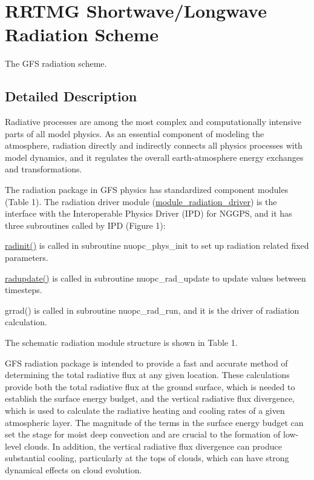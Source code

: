 \hypertarget{group___r_r_t_m_g}{}\section{R\+R\+T\+MG Shortwave/\+Longwave Radiation Scheme}
\label{group___r_r_t_m_g}


The G\+FS radiation scheme.  




\subsection{Detailed Description}
Radiative processes are among the most complex and computationally intensive parts of all model physics. As an essential component of modeling the atmosphere, radiation directly and indirectly connects all physics processes with model dynamics, and it regulates the overall earth-\/atmosphere energy exchanges and transformations.

The radiation package in G\+FS physics has standardized component modules (Table 1). The radiation driver module (\hyperlink{group__module__radiation__driver}{module\+\_\+radiation\+\_\+driver}) is the interface with the Interoperable Physics Driver (I\+PD) for N\+G\+G\+PS, and it has three subroutines called by I\+PD (Figure 1)\+:
\begin{DoxyItemize}
\item \hyperlink{group__module__radiation__driver_ga3d4ef1d77b7d7ef09fafcb4413e1cbf2}{radinit()} is called in subroutine nuopc\+\_\+phys\+\_\+init to set up radiation related fixed parameters.
\item \hyperlink{group__module__radiation__driver_ga28280ee9ea8ee0d183ab9d541a31b718}{radupdate()} is called in subroutine nuopc\+\_\+rad\+\_\+update to update values between timesteps.
\item grrad() is called in subroutine nuopc\+\_\+rad\+\_\+run, and it is the driver of radiation calculation. 
\end{DoxyItemize}

The schematic radiation module structure is shown in Table 1. 

G\+FS radiation package is intended to provide a fast and accurate method of determining the total radiative flux at any given location. These calculations provide both the total radiative flux at the ground surface, which is needed to establish the surface energy budget, and the vertical radiative flux divergence, which is used to calculate the radiative heating and cooling rates of a given atmospheric layer. The magnitude of the terms in the surface energy budget can set the stage for moist deep convection and are crucial to the formation of low-\/level clouds. In addition, the vertical radiative flux divergence can produce substantial cooling, particularly at the tops of clouds, which can have strong dynamical effects on cloud evolution.

